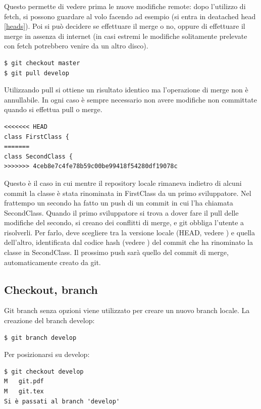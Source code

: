 \documentclass{article}
\begin{document}
Questo permette di vedere prima le nuove modifiche remote: dopo l'utilizzo di
fetch, si possono guardare al volo facendo ad esempio
 (si entra in deatached head \ref{heads}).
Poi si può decidere se effettuare il merge o no, oppure di effettuare il merge
in assenza di internet (in casi estremi le modifiche solitamente prelevate con
fetch potrebbero venire da un altro disco).

\begin{verbatim}
$ git checkout master
$ git pull develop
\end{verbatim}

Utilizzando pull si ottiene un risultato identico ma l'operazione di merge non è
annullabile.
In ogni caso è sempre necessario non avere modifiche non committate quando si
effettua pull o merge.

\begin{verbatim}
<<<<<<< HEAD
class FirstClass {
=======
class SecondClass {
>>>>>>> 4ceb8e7c4fe78b59c00be99418f54280df19078c
\end{verbatim}

Questo è il caso in cui mentre il repository locale rimaneva indietro di alcuni
commit la classe è stata rinominata in FirstClass da un primo sviluppatore. Nel
frattempo un secondo ha fatto un push di un commit in cui l'ha chiamata
SecondClass. Quando il primo sviluppatore si trova a dover fare il pull delle modifiche del
secondo, si creano dei conflitti di merge, e git obbliga l'utente a risolverli.
Per farlo, deve scegliere tra la versione locale (HEAD, vedere ) e 
quella dell'altro, identificata dal codice hash (vedere ) del commit
che ha rinominato la classe in SecondClass.
Il prossimo push sarà quello del commit di merge, automaticamente creato da git.

\subsection{Checkout, branch}
Git branch senza opzioni viene utilizzato per creare un nuovo branch locale. La
creazione del branch develop:

\begin{verbatim}
$ git branch develop
\end{verbatim}

Per posizionarsi su develop:

\begin{verbatim}
$ git checkout develop
M	git.pdf
M	git.tex
Si è passati al branch 'develop'
\end{verbatim}
\end{document}
